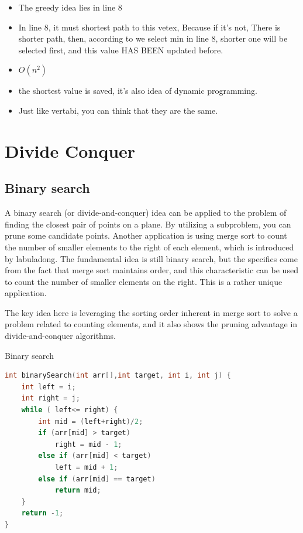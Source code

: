 \documentclass[a4paper,11pt,twoside]{book}
\begin{document}
\begin{itemize}
\item The greedy idea lies in line 8
\item In line 8, it must shortest path to this vetex,  Because if it's not, There is shorter path, then, according to we select min in line 8, shorter one will be selected first, and this value HAS BEEN updated before. 
\item $O(n^{2})$
\item the shortest value is saved, it's also idea of dynamic programming.
\item Just like vertabi, you can think that they are the same. 
\end{itemize}


\section{Divide Conquer}
\subsection{Binary search}

	\par A binary search (or divide-and-conquer) idea can be applied to the problem of finding the closest pair of points on a plane. By utilizing a subproblem, you can prune some candidate points. Another application is using merge sort to count the number of smaller elements to the right of each element, which is introduced by labuladong. The fundamental idea is still binary search, but the specifics come from the fact that merge sort maintains order, and this characteristic can be used to count the number of smaller elements on the right. This is a rather unique application.
	
	\par The key idea here is leveraging the sorting order inherent in merge sort to solve a problem related to counting elements, and it also shows the pruning advantage in divide-and-conquer algorithms.
	
	\par Binary search

\begin{lstlisting}[frame=single, language=c++]
int binarySearch(int arr[],int target, int i, int j) {
	int left = i;
	int right = j;
	while ( left<= right) {
		int mid = (left+right)/2;
		if (arr[mid] > target)
			right = mid - 1;
		else if (arr[mid] < target)
			left = mid + 1;
		else if (arr[mid] == target)
			return mid;
	}
	return -1;
} 
\end{lstlisting}
\end{document}
